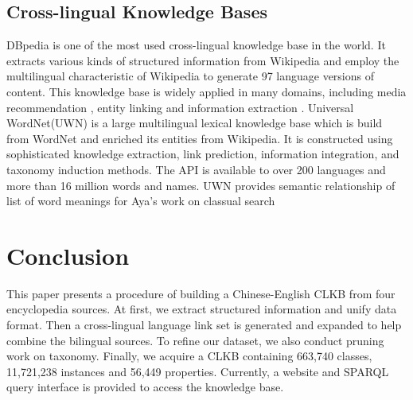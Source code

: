 \documentclass[runningheads,a4paper]{llncs}
\begin{document}
\subsection{Cross-lingual Knowledge Bases}
DBpedia \cite{auer2007dbpedia,mendes2012dbpedia} is one of the most used cross-lingual knowledge base in the world. It extracts various kinds of structured information from Wikipedia and employ the multilingual characteristic of Wikipedia to generate 97 language versions of content. This knowledge base is widely applied in many domains, including media recommendation \cite{fernandez2011generic,kaminskas2012knowledge}, entity linking\cite{mendes2011evaluating} and information extraction \cite{dutta2013integrating}. Universal WordNet(UWN)\cite{de2012uwn} is a large multilingual lexical knowledge base which is build from WordNet and enriched its entities from Wikipedia. It is constructed using sophisticated knowledge extraction, link prediction, information integration, and taxonomy induction methods. The API is available to over 200 languages and more than 16 million words and names. UWN provides semantic relationship of list of word meanings for Aya's work on classual search \cite{al2015classual}


\section{Conclusion}
\label{sec:con}
This paper presents a procedure of building a Chinese-English CLKB from four encyclopedia sources. At first, we extract structured information and unify data format. Then a cross-lingual language link set is generated and expanded to help combine the bilingual sources. To refine our dataset, we also conduct pruning work on taxonomy. Finally, we acquire a CLKB containing 663,740 classes, 11,721,238 instances and 56,449 properties. Currently, a website and SPARQL query interface is provided to access the knowledge base.
\end{document}

